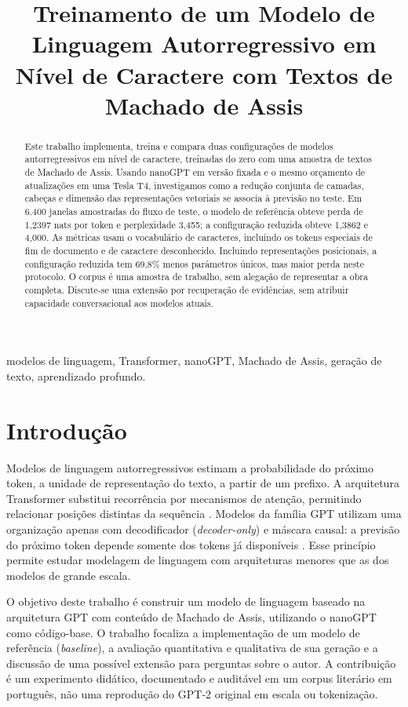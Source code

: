 \documentclass[conference]{IEEEtran}
\title{Treinamento de um Modelo de Linguagem Autorregressivo em Nível de Caractere com Textos de Machado de Assis}
\author{%
  \IEEEauthorblockN{FABRICIO FERNANDES SANTANA}
  \IEEEauthorblockA{Departamento de Ciência da Computação\\
  Universidade de Brasília\\
  Matrícula: 262114527}
}
\begin{document}
\maketitle

\begin{abstract}
Este trabalho implementa, treina e compara duas configurações de modelos autorregressivos em nível de caractere, treinadas do zero com uma amostra de textos de Machado de Assis. Usando nanoGPT em versão fixada e o mesmo orçamento de atualizações em uma Tesla T4, investigamos como a redução conjunta de camadas, cabeças e dimensão das representações vetoriais se associa à previsão no teste. Em 6.400 janelas amostradas do fluxo de teste, o modelo de referência obteve perda de 1,2397 nats por token e perplexidade 3,455; a configuração reduzida obteve 1,3862 e 4,000. As métricas usam o vocabulário de caracteres, incluindo os tokens especiais de fim de documento e de caractere desconhecido. Incluindo representações posicionais, a configuração reduzida tem 69,8\% menos parâmetros únicos, mas maior perda neste protocolo. O corpus é uma amostra de trabalho, sem alegação de representar a obra completa. Discute-se uma extensão por recuperação de evidências, sem atribuir capacidade conversacional aos modelos atuais.
\end{abstract}

\begin{IEEEkeywords}
modelos de linguagem, Transformer, nanoGPT, Machado de Assis, geração de texto, aprendizado profundo.
\end{IEEEkeywords}

\section{Introdução}

Modelos de linguagem autorregressivos estimam a probabilidade do próximo token, a unidade de representação do texto, a partir de um prefixo. A arquitetura Transformer substitui recorrência por mecanismos de atenção, permitindo relacionar posições distintas da sequência \cite{vaswani2017}. Modelos da família GPT utilizam uma organização apenas com decodificador (\textit{decoder-only}) e máscara causal: a previsão do próximo token depende somente dos tokens já disponíveis \cite{radford2019}. Esse princípio permite estudar modelagem de linguagem com arquiteturas menores que as dos modelos de grande escala.

O objetivo deste trabalho é construir um modelo de linguagem baseado na arquitetura GPT com conteúdo de Machado de Assis, utilizando o nanoGPT como código-base. O trabalho focaliza a implementação de um modelo de referência (\textit{baseline}), a avaliação quantitativa e qualitativa de sua geração e a discussão de uma possível extensão para perguntas sobre o autor. A contribuição é um experimento didático, documentado e auditável em um corpus literário em português, não uma reprodução do GPT-2 original em escala ou tokenização.
\end{document}
